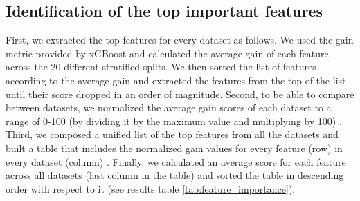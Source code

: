 \documentclass{bmcart}
\begin{document}


\subsection*{Identification of the top important features}
First, we extracted the top features for every dataset as follows. We used the gain metric provided by xGBoost and calculated the average gain of each feature across the 20 different stratified splits. We then sorted the list of features according to the average gain and extracted the features from the top of the list until their score dropped in an order of magnitude.  
Second, to be able to compare between datasets, we normalized the average gain scores of each dataset to a range of 0-100 (by dividing it by the maximum value and multiplying by 100) . 
Third, we composed a unified list of the top features from all the datasets and built a table that includes the normalized gain values for every feature (row) in every dataset (column) . Finally, we calculated an average score for each feature across all datasets (last column in the table) and sorted the table in descending order with respect to it (see results table \ref{tab:feature_importance}).



\end{document}
